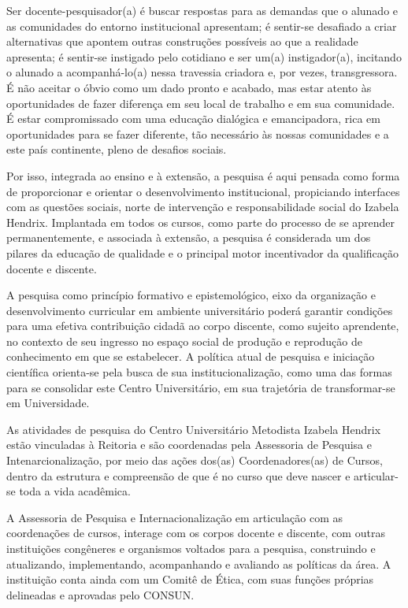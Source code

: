 \documentclass[a4paper, 12pt, openright, oneside, german, french, english, brazil]{abntex2}
\begin{document}
Ser docente-pesquisador(a) é buscar respostas para as demandas que o alunado e as comunidades do entorno institucional apresentam; é sentir-se desafiado a criar alternativas que apontem outras construções possíveis ao que a realidade apresenta; é sentir-se instigado pelo cotidiano e ser um(a) instigador(a), incitando o alunado a acompanhá-lo(a) nessa travessia criadora e, por vezes, transgressora. É não aceitar o óbvio como um dado pronto e acabado, mas estar atento às oportunidades de fazer diferença em seu local de trabalho e em sua comunidade. É estar compromissado com uma educação dialógica e emancipadora, rica em oportunidades para se fazer diferente, tão necessário às nossas comunidades e a este país continente, pleno de desafios sociais.

Por isso, integrada ao ensino e à extensão, a pesquisa é aqui pensada como forma de proporcionar e orientar o desenvolvimento institucional, propiciando interfaces com as questões sociais, norte de intervenção e responsabilidade social do Izabela Hendrix. Implantada em todos os cursos, como parte do processo de se aprender permanentemente, e associada à extensão, a pesquisa é considerada um dos pilares da educação de qualidade e o principal motor incentivador da qualificação docente e discente.

A pesquisa como princípio formativo e epistemológico, eixo da organização e desenvolvimento curricular em ambiente universitário poderá garantir condições para uma efetiva contribuição cidadã ao corpo discente, como sujeito aprendente, no contexto de seu ingresso no espaço social de produção e reprodução de conhecimento em que se estabelecer. A política atual de pesquisa e iniciação científica orienta-se pela busca de sua institucionalização, como uma das formas para se consolidar este Centro Universitário, em sua trajetória de transformar-se em Universidade.

As atividades de pesquisa do Centro Universitário Metodista Izabela Hendrix estão vinculadas à Reitoria e são coordenadas pela Assessoria de Pesquisa e Intenarcionalização, por meio das ações dos(as) Coordenadores(as) de Cursos, dentro da estrutura e compreensão de que é no curso que deve nascer e articular-se toda a vida acadêmica.

A Assessoria de Pesquisa e Internacionalização em articulação com as coordenações de cursos, interage com os corpos docente e discente, com outras instituições congêneres e organismos voltados para a pesquisa, construindo e atualizando, implementando, acompanhando e avaliando as políticas da área. A instituição conta ainda com um Comitê de Ética, com suas funções próprias delineadas e aprovadas pelo CONSUN.
\end{document}
